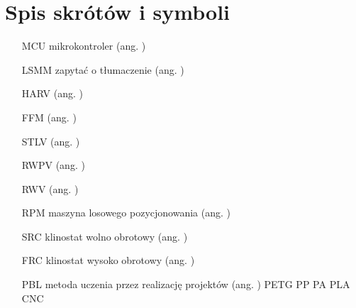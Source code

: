 \chapter*{Spis skrótów i symboli}

\begin{itemize}
	\item[MCU] mikrokontroler (ang. )
	\item[LSMM] zapytać o tłumaczenie  (ang. )
	\item[HARV]  ({ang. })
	\item[FFM]  ({ang. })
	\item[STLV]  ({ang. })
	\item[RWPV]  ({ang. })
	\item[RWV]  ({ang. })
	\item[RPM] maszyna losowego pozycjonowania ({ang. })
	\item[SRC] klinostat wolno obrotowy ({ang. })
	\item[FRC] klinostat wysoko obrotowy  ({ang. })
	\item[PBL] metoda uczenia przez realizację projektów   ({ang. })
	PETG
	PP
	PA
	PLA
	CNC
\end{itemize}
